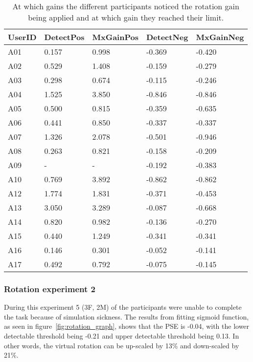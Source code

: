 \begin{table}[]
\centering
\begin{tabular}{@{}lllll@{}}
\toprule
UserID & DetectPos & MxGainPos & DetectNeg & MxGainNeg   \\ \midrule
A01    & 0.157      & 0.998     & -0.369     & -0.420    \\
A02    & 0.529      & 1.408     & -0.159     & -0.279    \\
A03    & 0.298      & 0.674     & -0.115     & -0.246    \\
A04    & 1.525      & 3.850     & -0.846     & -0.846    \\
A05    & 0.500      & 0.815     & -0.359     & -0.635    \\
A06    & 0.441      & 0.850     & -0.337     & -0.337    \\
A07    & 1.326      & 2.078     & -0.501     & -0.946    \\
A08    & 0.263      & 0.821     & -0.158     & -0.209    \\
A09    & -          & -         & -0.192     & -0.383    \\
A10    & 0.769      & 3.892     & -0.862     & -0.862    \\
A12    & 1.774      & 1.831     & -0.371     & -0.453    \\
A13    & 3.050      & 3.289     & -0.087     & -0.668    \\
A14    & 0.820      & 0.982     & -0.136     & -0.270    \\
A15    & 0.440      & 1.249     & -0.341     & -0.341    \\
A16    & 0.146      & 0.301     & -0.052     & -0.141    \\
A17    & 0.492      & 0.792     & -0.075     & -0.145    \\ \bottomrule
\end{tabular}
\caption{At which gains the different participants noticed the rotation gain being applied and at which gain they reached their limit.}
\label{tab:rotation_increment}
\end{table}

\subsubsection{Rotation experiment 2}
During this experiment 5 (3F, 2M) of the participants were unable to complete the task because of simulation sickness. The results from fitting sigmoid function, as seen in figure~\ref{fig:rotation_graph}, shows that the PSE is -0.04, with the lower detectable threshold being -0.21 and upper detectable threshold being 0.13. In other words, the virtual rotation can be up-scaled by 13\% and down-scaled by 21\%.

